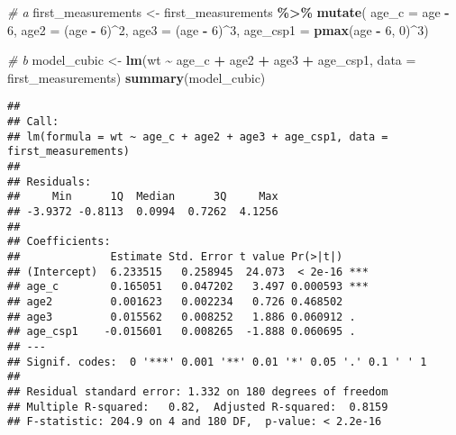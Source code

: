 \documentclass[
]{article}
\newenvironment{Shaded}{\begin{snugshade}}{\end{snugshade}}
\newcommand{\AttributeTok}[1]{\textcolor[rgb]{0.13,0.29,0.53}{#1}}
\newcommand{\CommentTok}[1]{\textcolor[rgb]{0.56,0.35,0.01}{\textit{#1}}}
\newcommand{\DecValTok}[1]{\textcolor[rgb]{0.00,0.00,0.81}{#1}}
\newcommand{\FunctionTok}[1]{\textcolor[rgb]{0.13,0.29,0.53}{\textbf{#1}}}
\newcommand{\NormalTok}[1]{#1}
\newcommand{\OtherTok}[1]{\textcolor[rgb]{0.56,0.35,0.01}{#1}}
\newcommand{\SpecialCharTok}[1]{\textcolor[rgb]{0.81,0.36,0.00}{\textbf{#1}}}
\begin{document}
\begin{Shaded}
\begin{Highlighting}[]
\CommentTok{\# a}
\NormalTok{first\_measurements }\OtherTok{\textless{}{-}}\NormalTok{ first\_measurements }\SpecialCharTok{\%\textgreater{}\%}
  \FunctionTok{mutate}\NormalTok{(}
    \AttributeTok{age\_c =}\NormalTok{ age }\SpecialCharTok{{-}} \DecValTok{6}\NormalTok{,                   }
    \AttributeTok{age2 =}\NormalTok{ (age }\SpecialCharTok{{-}} \DecValTok{6}\NormalTok{)}\SpecialCharTok{\^{}}\DecValTok{2}\NormalTok{,                }
    \AttributeTok{age3 =}\NormalTok{ (age }\SpecialCharTok{{-}} \DecValTok{6}\NormalTok{)}\SpecialCharTok{\^{}}\DecValTok{3}\NormalTok{,                }
    \AttributeTok{age\_csp1 =} \FunctionTok{pmax}\NormalTok{(age }\SpecialCharTok{{-}} \DecValTok{6}\NormalTok{, }\DecValTok{0}\NormalTok{)}\SpecialCharTok{\^{}}\DecValTok{3}\NormalTok{)}

\CommentTok{\# b}
\NormalTok{model\_cubic }\OtherTok{\textless{}{-}} \FunctionTok{lm}\NormalTok{(wt }\SpecialCharTok{\textasciitilde{}}\NormalTok{ age\_c }\SpecialCharTok{+}\NormalTok{ age2 }\SpecialCharTok{+}\NormalTok{ age3 }\SpecialCharTok{+}\NormalTok{ age\_csp1, }\AttributeTok{data =}\NormalTok{ first\_measurements)}
\FunctionTok{summary}\NormalTok{(model\_cubic)}
\end{Highlighting}
\end{Shaded}

\begin{verbatim}
## 
## Call:
## lm(formula = wt ~ age_c + age2 + age3 + age_csp1, data = first_measurements)
## 
## Residuals:
##     Min      1Q  Median      3Q     Max 
## -3.9372 -0.8113  0.0994  0.7262  4.1256 
## 
## Coefficients:
##              Estimate Std. Error t value Pr(>|t|)    
## (Intercept)  6.233515   0.258945  24.073  < 2e-16 ***
## age_c        0.165051   0.047202   3.497 0.000593 ***
## age2         0.001623   0.002234   0.726 0.468502    
## age3         0.015562   0.008252   1.886 0.060912 .  
## age_csp1    -0.015601   0.008265  -1.888 0.060695 .  
## ---
## Signif. codes:  0 '***' 0.001 '**' 0.01 '*' 0.05 '.' 0.1 ' ' 1
## 
## Residual standard error: 1.332 on 180 degrees of freedom
## Multiple R-squared:   0.82,  Adjusted R-squared:  0.8159 
## F-statistic: 204.9 on 4 and 180 DF,  p-value: < 2.2e-16
\end{verbatim}
\end{document}
